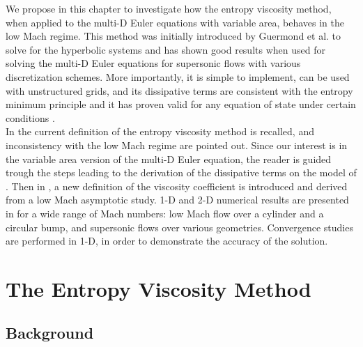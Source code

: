We propose in this chapter to investigate how the entropy viscosity method, when applied to the multi-D Euler equations with variable area, behaves in the low Mach regime. This method was initially introduced by Guermond et al. to solve for the hyperbolic systems and has shown good results when used for solving the multi-D Euler equations for supersonic flows with various discretization schemes. More importantly, it is simple to implement, can be used with unstructured grids,  and its dissipative terms are consistent with the entropy minimum principle and it has proven valid for any equation of state under certain conditions \cite{jlg}. \\

In  the current definition of the entropy viscosity method is recalled, and inconsistency with the low Mach regime are pointed out. Since our interest is in the variable area version of the multi-D Euler equation, the reader is guided trough the steps leading to the derivation of the dissipative terms on the model of \cite{jlg}. Then in , a new definition of the viscosity coefficient is introduced and derived from a low Mach asymptotic study. 1-D and 2-D numerical results are presented in  for a wide range of Mach numbers: low Mach flow over a cylinder and a circular bump, and supersonic flows over various geometries. Convergence studies are performed in 1-D, in order to demonstrate the accuracy of the solution.

\section{The Entropy Viscosity Method} \label{sec:entro_visc}

\subsection{Background} \label{sec:background}

